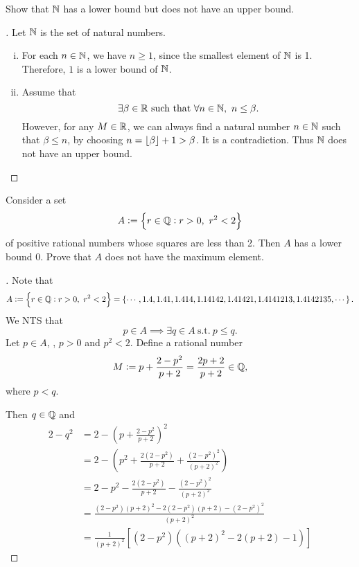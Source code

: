 \documentclass[11pt,openany]{article}
\begin{document}
\vfill
\begin{exercise*}
	Show that $\mathbb{N}$ has a lower bound but does not have an upper bound.
	\begin{proof}[\sol]
		Let $\mathbb{N}$ is the set of natural numbers. \begin{enumerate}[(i)]
			\item For each $n\in\mathbb{N}$, we have $n\geq 1$, since the smallest element of $\mathbb{N}$ is 1. Therefore, $1$ is a lower bound of $\mathbb{N}$.
			\item Assume that \[
			\exists \beta\in\R\ \text{such that}\ \forall n\in\N,\ n\leq\beta.
			\]  However, for any $M\in\mathbb{R}$, we can always find a natural number $n\in\mathbb{N}$ such that $\beta\leq n$, by choosing $n=\lfloor\beta\rfloor + 1 > \beta$. It is a contradiction. Thus $\mathbb{N}$ does not have an upper bound.
		\end{enumerate}
	\end{proof}
\end{exercise*}
\begin{exercise*}[\textcolor{violet}{$\star$}]
	Consider a set \[
	A:=\set{r\in\Q:r>0,\ r^2<2}
	\] of positive rational numbers whose squares are less than 2. Then $A$ has a lower bound $0$. Prove that $A$ does not have the maximum element.
	\begin{proof}[\sol]
		Note that \[
		A:=\set{r\in\Q:r>0,\ r^2<2}=\set{\cdots,1.4, 1.41, 1.414, 1.14142, 1.41421, 1.4141213, 1.4142135, \cdots}.
		\]We NTS that \[
		p\in A\implies \exists q\in A\ \text{s.t.}\ p\leq q. 
		\] Let $p\in A$, \ie, $p>0$ and $p^2<2$. Define a rational number \[
		M:=p + \frac{2-p^2}{p+2}=\frac{2p+2}{p+2}\in\mathbb{Q},	
		\] where $p<q$. 
		\begin{center}
		
		\end{center}
		
		Then $q\in\mathbb{Q}$ and \begin{align*}
			2-q^2&=2-\left(p + \frac{2-p^2}{p+2}\right)^2\\
			&=2-\left(p^2+\frac{2(2-p^2)}{p+2}+\frac{(2-p^2)^2}{(p+2)^2}\right) \\
			&=2-p^2-\frac{2(2-p^2)}{p+2}-\frac{(2-p^2)^2}{(p+2)^2} \\
			&=\frac{(2-p^2)(p+2)^2-2(2-p^2)(p+2)-(2-p^2)^2}{(p+2)^2} \\
			&=\frac{1}{(p+2)^2}\left[(2-p^2)((p+2)^2-2(p+2)-1)\right]
		\end{align*}
	\end{proof}
\end{exercise*}
\newpage
\end{document}

